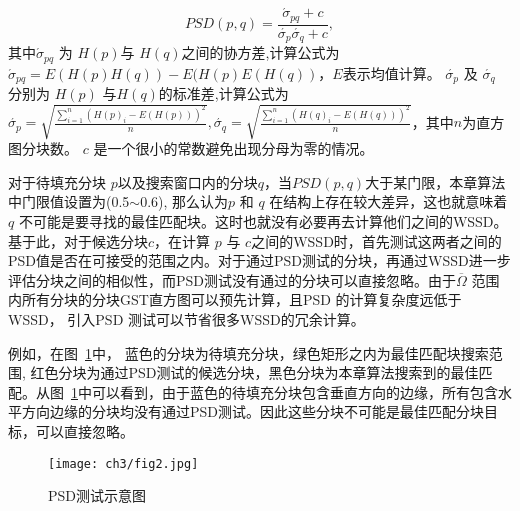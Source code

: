  $$PSD(p,q)=\frac{\acute{\sigma}_{pq}+c}{\acute{\sigma_p}\acute{\sigma_q}+c},$$
其中\(\acute{\sigma}_{pq}\) 为 \(H(p)\)与 \(H(q)\)之间的协方差,计算公式为$\acute{\sigma}_{pq}=E(H(p)H(q)) - E(H(p)E(H(q))$，$E$表示均值计算。 \(\acute{\sigma_p}\) 及 \(\acute{\sigma_q}\) 分别为 \(H(p)\) 与\(H(q)\)的标准差,计算公式为$\acute{\sigma_p}=\sqrt{\frac{\sum_{i=1}^{n}(H(p)_i-E(H(p)))^2}{n}},\acute{\sigma_q}=\sqrt{\frac{\sum_{i=1}^{n}(H(q)_i-E(H(q)))^2}{n}}$，其中$n$为直方图分块数。 \(c\) 是一个很小的常数避免出现分母为零的情况。\par
 对于待填充分块 \(p\)以及搜索窗口内的分块\(q\)，当\(PSD(p,q)\)大于某门限，本章算法中门限值设置为(0.5\(\sim\)0.6), 那么认为\(p\) 和 \(q\) 在结构上存在较大差异，这也就意味着\(q\) 不可能是要寻找的最佳匹配块。这时也就没有必要再去计算他们之间的WSSD。 基于此，对于候选分块\(c\)，在计算 \(p\) 与 \(c\)之间的WSSD时，首先测试这两者之间的PSD值是否在可接受的范围之内。对于通过PSD测试的分块，再通过WSSD进一步评估分块之间的相似性，而PSD测试没有通过的分块可以直接忽略。由于\(\overline{\Omega}\) 范围内所有分块的分块GST直方图可以预先计算，且PSD 的计算复杂度远低于WSSD， 引入PSD 测试可以节省很多WSSD的冗余计算。\par
例如，在图~\ref{chap03:fig:PSD}中， 蓝色的分块为待填充分块，绿色矩形之内为最佳匹配块搜索范围, 红色分块为通过PSD测试的候选分块，黑色分块为本章算法搜索到的最佳匹配。从图~\ref{chap03:fig:PSD}中可以看到，由于蓝色的待填充分块包含垂直方向的边缘，所有包含水平方向边缘的分块均没有通过PSD测试。因此这些分块不可能是最佳匹配分块目标，可以直接忽略。
 \begin{figure}[!htbp]
 	\begin{center}
 			\texttt{[image: ch3/fig2.jpg]}
 	\end{center}
     \caption{PSD测试示意图}
 	\label{chap03:fig:PSD}
 \end{figure}


